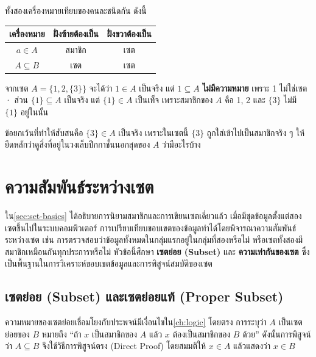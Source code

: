 \begin{warning}
ทั้งสองเครื่องหมายเทียบของคนละชนิดกัน ดังนี้

\begin{center}
\begin{tabular}{|c|c|c|}
\hline
\textbf{เครื่องหมาย} & \textbf{ฝั่งซ้ายต้องเป็น} & \textbf{ฝั่งขวาต้องเป็น} \\
\hline
$a \in A$ & สมาชิก & เซต \\
\hline
$A \subseteq B$ & เซต & เซต \\
\hline
\end{tabular}
\end{center}

จากเซต $A = \{1, 2, \{3\}\}$ จะได้ว่า $1 \in A$ เป็นจริง แต่ $1 \subseteq A$ \textbf{ไม่มีความหมาย} เพราะ 1 ไม่ใช่เซต · ส่วน $\{1\} \subseteq A$ เป็นจริง แต่ $\{1\} \in A$ เป็นเท็จ เพราะสมาชิกของ $A$ คือ 1, 2 และ $\{3\}$ ไม่มี $\{1\}$ อยู่ในนั้น

ข้อยกเว้นที่ทำให้สับสนคือ $\{3\} \in A$ เป็นจริง เพราะในเซตนี้ $\{3\}$ ถูกใส่เข้าไปเป็นสมาชิกจริง ๆ ให้ยึดหลักว่าดูสิ่งที่อยู่ในวงเล็บปีกกาชั้นนอกสุดของ $A$ ว่ามีอะไรบ้าง
\end{warning}

\section{ความสัมพันธ์ระหว่างเซต}
\label{sec:set-relations}

ใน\autoref{sec:set-basics} ได้อธิบายการนิยามสมาชิกและการเขียนเซตเดี่ยวแล้ว เมื่อมีชุดข้อมูลตั้งแต่สองเซตขึ้นไปในระบบคอมพิวเตอร์ การเปรียบเทียบขอบเขตของข้อมูลทำได้โดยพิจารณาความสัมพันธ์ระหว่างเซต เช่น การตรวจสอบว่าข้อมูลทั้งหมดในกลุ่มแรกอยู่ในกลุ่มที่สองหรือไม่ หรือเซตทั้งสองมีสมาชิกเหมือนกันทุกประการหรือไม่ หัวข้อนี้ศึกษา \textbf{เซตย่อย (Subset)} และ \textbf{ความเท่ากันของเซต} ซึ่งเป็นพื้นฐานในการวิเคราะห์ขอบเขตข้อมูลและการพิสูจน์สมบัติของเซต~\parencite{johnsonbaugh2016discrete}

\subsection{เซตย่อย (Subset) และเซตย่อยแท้ (Proper Subset)}
ความหมายของเซตย่อยเชื่อมโยงกับประพจน์มีเงื่อนไขใน\autoref{ch:logic} โดยตรง การระบุว่า $A$ เป็นเซตย่อยของ $B$ หมายถึง ``ถ้า $x$ เป็นสมาชิกของ $A$ แล้ว $x$ ต้องเป็นสมาชิกของ $B$ ด้วย'' ดังนั้นการพิสูจน์ว่า $A \subseteq B$ จึงใช้วิธีการพิสูจน์ตรง (Direct Proof) โดยสมมติให้ $x \in A$ แล้วแสดงว่า $x \in B$

